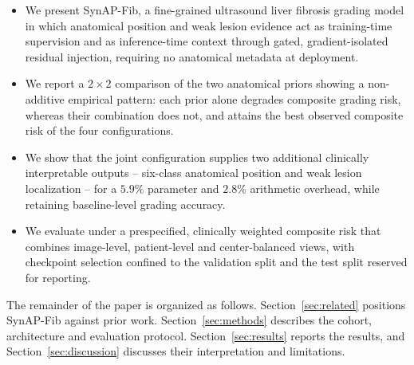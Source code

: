 \begin{itemize}
\item We present SynAP-Fib, a fine-grained ultrasound liver fibrosis grading
      model in which anatomical position and weak lesion evidence act as
      training-time supervision and as inference-time context through gated,
      gradient-isolated residual injection, requiring no anatomical metadata at
      deployment.
\item We report a $2\times2$ comparison of the two anatomical priors showing a
      non-additive empirical pattern: each prior alone degrades composite
      grading risk, whereas their combination does not, and attains the best
      observed composite risk of the four configurations.
\item We show that the joint configuration supplies two additional clinically
      interpretable outputs -- six-class anatomical position and weak lesion
      localization -- for a $5.9\%$ parameter and $2.8\%$ arithmetic overhead,
      while retaining baseline-level grading accuracy.
\item We evaluate under a prespecified, clinically weighted composite risk that
      combines image-level, patient-level and center-balanced views, with
      checkpoint selection confined to the validation split and the test split
      reserved for reporting.
\end{itemize}

The remainder of the paper is organized as follows. Section~\ref{sec:related}
positions SynAP-Fib against prior work. Section~\ref{sec:methods} describes the
cohort, architecture and evaluation protocol. Section~\ref{sec:results} reports
the results, and Section~\ref{sec:discussion} discusses their interpretation and
limitations.
